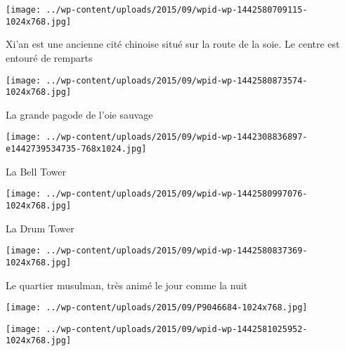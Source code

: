 \begin{center} \texttt{[image: ../wp-content/uploads/2015/09/wpid-wp-1442580709115-1024x768.jpg]} \end{center}

 

 Xi'an est une ancienne cité chinoise situé sur la route de la soie. Le centre est entouré de remparts 

 

\begin{center} \texttt{[image: ../wp-content/uploads/2015/09/wpid-wp-1442580873574-1024x768.jpg]} \end{center}

 

 La grande pagode de l'oie sauvage 

 

\begin{center} \texttt{[image: ../wp-content/uploads/2015/09/wpid-wp-1442308836897-e1442739534735-768x1024.jpg]} \end{center}

 

 La Bell Tower 

 

\begin{center} \texttt{[image: ../wp-content/uploads/2015/09/wpid-wp-1442580997076-1024x768.jpg]} \end{center}

 

 La Drum Tower 

 

\begin{center} \texttt{[image: ../wp-content/uploads/2015/09/wpid-wp-1442580837369-1024x768.jpg]} \end{center}

 

 Le quartier musulman, très animé le jour comme la nuit 

 

\begin{center} \texttt{[image: ../wp-content/uploads/2015/09/P9046684-1024x768.jpg]} \end{center}

 

 

\begin{center} \texttt{[image: ../wp-content/uploads/2015/09/wpid-wp-1442581025952-1024x768.jpg]} \end{center}

